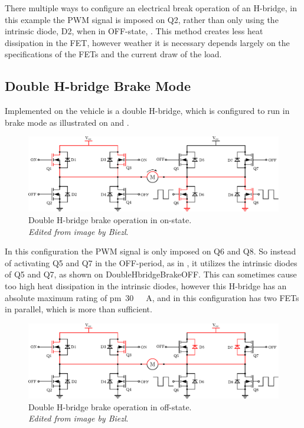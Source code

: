 There multiple ways to configure an electrical break operation of an H-bridge, in this example the PWM signal is imposed on Q2, rather than only using the intrinsic diode, D2, when in OFF-state,  \cite{DCook}. This method creates less heat dissipation in the FET, however weather it is necessary depends largely on the specifications of the FETs and the current draw of the load.

\subsection{Double H-bridge Brake Mode}
Implemented on the vehicle is a double H-bridge, which is configured to run in brake mode as illustrated on  and . 

\begin{figure}[H]
	\centering
	\includegraphics[scale=.6]{figures/DoubleHbridgeBrakeON.pdf}
	\caption{Double H-bridge brake operation in on-state.\\ \emph{Edited from image by Biezl}.\cite{Biezl}}
	\label{DoubleHbridgeBrakeON}
\end{figure}

In this configuration the PWM signal is only imposed on Q6 and Q8. So instead of activating Q5 and Q7 in the OFF-period, as in , it utilizes the intrinsic diodes of Q5 and Q7, as shown on \figurename{DoubleHbridgeBrakeOFF}. This can sometimes cause too high heat dissipation in the intrinsic diodes, however this H-bridge has an absolute maximum rating of \si{\pm 30 \ A}, and in this configuration has two FETs in parallel, which is more than sufficient\cite{STMicroelectronics}.

\begin{figure}[H]
	\centering
	\includegraphics[scale=.6]{figures/DoubleHbridgeBrakeOFF.pdf}
	\caption{Double H-bridge brake operation in off-state.\\ \emph{Edited from image by Biezl}.\cite{Biezl}}
	\label{DoubleHbridgeBrakeOFF}
\end{figure}

